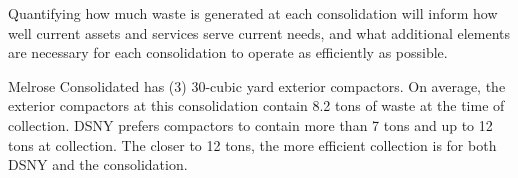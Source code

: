 
    Quantifying how much waste is generated at each consolidation will inform how well current assets and services serve current needs, and what additional elements are necessary for each consolidation to operate as efficiently as possible.
    
    Melrose Consolidated has (3) 30-cubic yard exterior compactors. On average, the exterior compactors at this consolidation contain 8.2 tons of waste at the time of collection. DSNY prefers compactors to contain more than 7 tons and up to 12 tons at collection. The closer to 12 tons, the more efficient collection is for both DSNY and the consolidation.